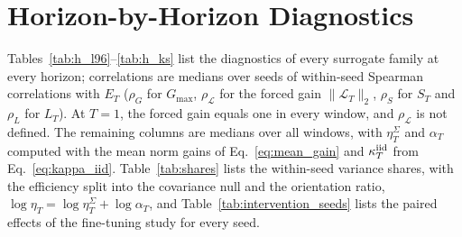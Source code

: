\section{Horizon-by-Horizon Diagnostics}
\label{app:tables}

Tables~\ref{tab:h_l96}--\ref{tab:h_ks} list the diagnostics of every surrogate family at every horizon; correlations are medians over seeds of within-seed Spearman correlations with $E_T$ ($\rho_G$ for $G_{\max}$, $\rho_{\mathcal L}$ for the forced gain $\|\mathcal L_T\|_2$, $\rho_S$ for $S_T$ and $\rho_L$ for $L_T$). At $T=1$, the forced gain equals one in every window, and $\rho_{\mathcal L}$ is not defined. The remaining columns are medians over all windows, with $\eta^\Sigma_T$ and $\alpha_T$ computed with the mean norm gains of Eq.~\eqref{eq:mean_gain} and $\kappa^{\rm iid}_T$ from Eq.~\eqref{eq:kappa_iid}. Table~\ref{tab:shares} lists the within-seed variance shares, with the efficiency split into the covariance null and the orientation ratio, $\log\eta_T=\log\eta^\Sigma_T+\log\alpha_T$, and Table~\ref{tab:intervention_seeds} lists the paired effects of the fine-tuning study for every seed.

\begin{table}[h]
\centering\scriptsize
\caption{L96-2000 surrogates.}
\label{tab:h_l96}
\resizebox{\textwidth}{!}{}
\end{table}

\begin{table}[h]
\centering\scriptsize
\caption{L96-150 surrogates.}
\label{tab:h_l96_150}
\resizebox{\textwidth}{!}{}
\end{table}

\begin{table}[h]
\centering\scriptsize
\caption{L96-20 surrogates.}
\label{tab:h_l96_20}
\resizebox{\textwidth}{!}{}
\end{table}

\begin{table}[h]
\centering\scriptsize
\caption{Kuramoto--Sivashinsky FNOs.}
\label{tab:h_ks}
\resizebox{\textwidth}{!}{}
\end{table}

\begin{table}[h]
\centering\scriptsize
\caption{Variance shares of the log-error (Proposition~\ref{prop:attribution}) at horizons where the median error is below half of the saturation level.}
\label{tab:shares}

\end{table}

\begin{table}[h]
\centering\scriptsize
\caption{Paired change of the test relative RMSE (\%) between the rollout and the one-step arms for every seed, over 312 non-overlapping windows of a common held-out trajectory, with window-bootstrap 95\% intervals. Negative values indicate a lower error of the rollout arm. For seed 0 of L96-2000, the validation selected the initial checkpoint in both arms.}
\label{tab:intervention_seeds}
\resizebox{\textwidth}{!}{}
\end{table}
